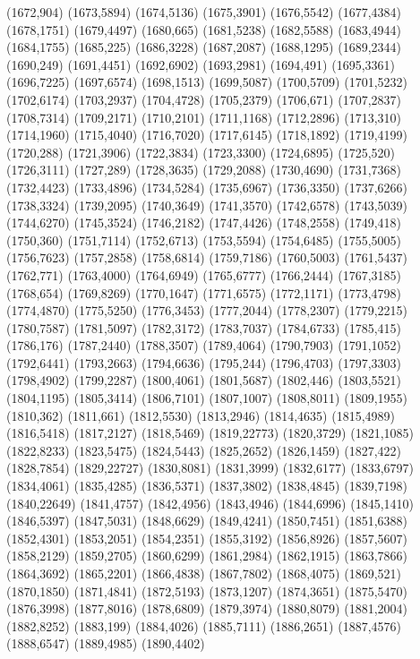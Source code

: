 (1672,904)
(1673,5894)
(1674,5136)
(1675,3901)
(1676,5542)
(1677,4384)
(1678,1751)
(1679,4497)
(1680,665)
(1681,5238)
(1682,5588)
(1683,4944)
(1684,1755)
(1685,225)
(1686,3228)
(1687,2087)
(1688,1295)
(1689,2344)
(1690,249)
(1691,4451)
(1692,6902)
(1693,2981)
(1694,491)
(1695,3361)
(1696,7225)
(1697,6574)
(1698,1513)
(1699,5087)
(1700,5709)
(1701,5232)
(1702,6174)
(1703,2937)
(1704,4728)
(1705,2379)
(1706,671)
(1707,2837)
(1708,7314)
(1709,2171)
(1710,2101)
(1711,1168)
(1712,2896)
(1713,310)
(1714,1960)
(1715,4040)
(1716,7020)
(1717,6145)
(1718,1892)
(1719,4199)
(1720,288)
(1721,3906)
(1722,3834)
(1723,3300)
(1724,6895)
(1725,520)
(1726,3111)
(1727,289)
(1728,3635)
(1729,2088)
(1730,4690)
(1731,7368)
(1732,4423)
(1733,4896)
(1734,5284)
(1735,6967)
(1736,3350)
(1737,6266)
(1738,3324)
(1739,2095)
(1740,3649)
(1741,3570)
(1742,6578)
(1743,5039)
(1744,6270)
(1745,3524)
(1746,2182)
(1747,4426)
(1748,2558)
(1749,418)
(1750,360)
(1751,7114)
(1752,6713)
(1753,5594)
(1754,6485)
(1755,5005)
(1756,7623)
(1757,2858)
(1758,6814)
(1759,7186)
(1760,5003)
(1761,5437)
(1762,771)
(1763,4000)
(1764,6949)
(1765,6777)
(1766,2444)
(1767,3185)
(1768,654)
(1769,8269)
(1770,1647)
(1771,6575)
(1772,1171)
(1773,4798)
(1774,4870)
(1775,5250)
(1776,3453)
(1777,2044)
(1778,2307)
(1779,2215)
(1780,7587)
(1781,5097)
(1782,3172)
(1783,7037)
(1784,6733)
(1785,415)
(1786,176)
(1787,2440)
(1788,3507)
(1789,4064)
(1790,7903)
(1791,1052)
(1792,6441)
(1793,2663)
(1794,6636)
(1795,244)
(1796,4703)
(1797,3303)
(1798,4902)
(1799,2287)
(1800,4061)
(1801,5687)
(1802,446)
(1803,5521)
(1804,1195)
(1805,3414)
(1806,7101)
(1807,1007)
(1808,8011)
(1809,1955)
(1810,362)
(1811,661)
(1812,5530)
(1813,2946)
(1814,4635)
(1815,4989)
(1816,5418)
(1817,2127)
(1818,5469)
(1819,22773)
(1820,3729)
(1821,1085)
(1822,8233)
(1823,5475)
(1824,5443)
(1825,2652)
(1826,1459)
(1827,422)
(1828,7854)
(1829,22727)
(1830,8081)
(1831,3999)
(1832,6177)
(1833,6797)
(1834,4061)
(1835,4285)
(1836,5371)
(1837,3802)
(1838,4845)
(1839,7198)
(1840,22649)
(1841,4757)
(1842,4956)
(1843,4946)
(1844,6996)
(1845,1410)
(1846,5397)
(1847,5031)
(1848,6629)
(1849,4241)
(1850,7451)
(1851,6388)
(1852,4301)
(1853,2051)
(1854,2351)
(1855,3192)
(1856,8926)
(1857,5607)
(1858,2129)
(1859,2705)
(1860,6299)
(1861,2984)
(1862,1915)
(1863,7866)
(1864,3692)
(1865,2201)
(1866,4838)
(1867,7802)
(1868,4075)
(1869,521)
(1870,1850)
(1871,4841)
(1872,5193)
(1873,1207)
(1874,3651)
(1875,5470)
(1876,3998)
(1877,8016)
(1878,6809)
(1879,3974)
(1880,8079)
(1881,2004)
(1882,8252)
(1883,199)
(1884,4026)
(1885,7111)
(1886,2651)
(1887,4576)
(1888,6547)
(1889,4985)
(1890,4402)
